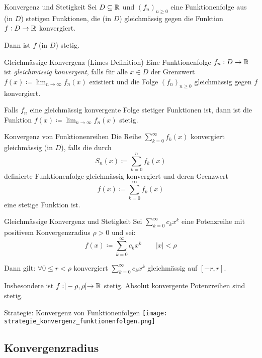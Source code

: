 \begin{theorem}{Konvergenz und Stetigkeit}
    Sei $D \subseteq \mathbb{R}$ und $(f_n)_{n\geq 0}$ eine Funktionenfolge aus (in $D$) stetigen Funktionen, die (in $D$) gleichmässig gegen die Funktion $f:D \to \mathbb{R}$ konvergiert.

    Dann ist $f$ (in $D$) stetig.
\end{theorem}

\begin{definition}{Gleichmässige Konvergenz (Limes-Definition)}
    Eine Funktionenfolge $f_n : D \to \mathbb{R}$ ist \emph{gleichmässig konvergent}, falls für alle $x \in D$ der Grenzwert $f(x) \coloneqq \lim_{n \to \infty} f_n(x)$ existiert und die Folge $(f_n)_{n\geq 0}$ gleichmässig gegen $f$ konvergiert.

    Falls $f_n$ eine gleichmässig konvergente Folge stetiger Funktionen ist, dann ist die Funktion $f(x) \coloneqq \lim_{n \to \infty} f_n(x)$ stetig.
\end{definition}

\begin{definition}{Konvergenz von Funktionenreihen}
    Die Reihe $\sum_{k=0}^\infty f_k(x)$ konvergiert gleichmässig (in $D$), falls die durch
    $$S_n(x) \coloneqq \sum_{k=0}^n f_k(x)$$
    definierte Funktionenfolge gleichmässig konvergiert und deren Grenzwert
    $$f(x) \coloneqq \sum_{k=0}^\infty f_k(x)$$
    eine stetige Funktion ist.
\end{definition}

\begin{theorem}{Gleichmässige Konvergenz und Stetigkeit}
    Sei $\sum_{k=0}^\infty c_k x^k$ eine Potenzreihe mit positivem Konvergenzradius $\rho > 0$ und sei:
    \begin{equation*}
        f(x) \coloneqq \sum_{k=0}^\infty c_k x^k \qquad |x| < \rho
    \end{equation*}

    Dann gilt: $\forall 0 \leq r < \rho$ konvergiert $\sum_{k=0}^\infty c_k x^k$ gleichmässig auf $[-r,r]$.

    Insbesondere ist $f:]-\rho, \rho[ \to \mathbb{R}$ stetig. Absolut konvergente Potenzreihen sind stetig.
\end{theorem}

\begin{KR}{Strategie: Konvergenz von Funktionenfolgen}
    \texttt{[image: strategie\_konvergenz\_funktionenfolgen.png]}
\end{KR}

\subsection{Konvergenzradius}

